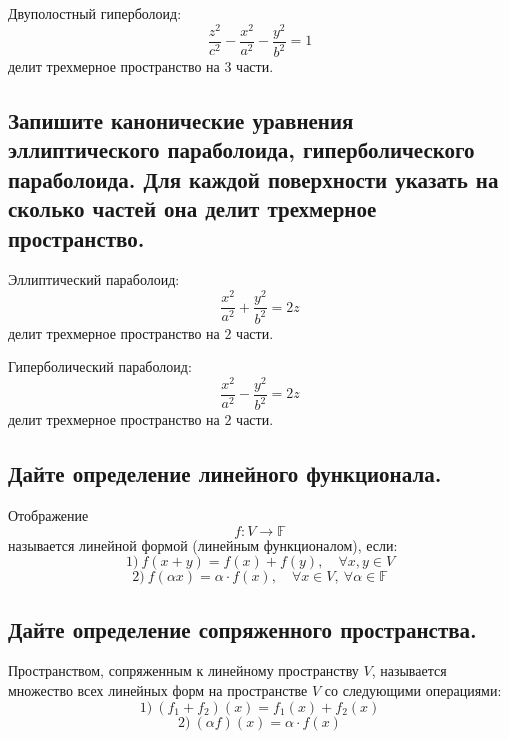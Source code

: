 \begin{remark}
    Двуполостный гиперболоид:
    \[
        \frac{z^2}{c^2}-\frac{x^2}{a^2}-\frac{y^2}{b^2}=1
    \]
    делит трехмерное пространство на $3$ части.
\end{remark}


\subsection{Запишите канонические уравнения эллиптического параболоида, гиперболического параболоида. Для каждой поверхности указать на сколько частей она делит трехмерное пространство.}

\begin{remark}
    Эллиптический параболоид:
    \[
        \frac{x^2}{a^2}+\frac{y^2}{b^2}=2z
    \]
    делит трехмерное пространство на $2$ части.
\end{remark}

\begin{remark}
    Гиперболический параболоид:
    \[
        \frac{x^2}{a^2}-\frac{y^2}{b^2}=2z
    \]
    делит трехмерное пространство на $2$ части.
\end{remark}

\subsection{Дайте определение линейного функционала.}

\begin{definition}
    Отображение
    \[
        f: V \to \mathbb{F}
    \]
    называется линейной формой (линейным функционалом), если:
    \[
        1)\ f(x+y)=f(x)+f(y),\quad \forall x, y \in V
    \]
    \[
        2)\ f(\alpha x)=\alpha \cdot f(x),\quad \forall x \in V,\ \forall \alpha \in \mathbb{F}
    \]
\end{definition}

\subsection{Дайте определение сопряженного пространства.}
\begin{definition}
    Пространством, сопряженным к линейному пространству $V$, называется множество всех линейных форм на пространстве $V$ со следующими операциями:
    \[
        1)\ (f_1 + f_2)(x) = f_1(x) + f_2(x)
    \]
    \[
        2)\ (\alpha f)(x) = \alpha \cdot f(x)
    \]
\end{definition}

